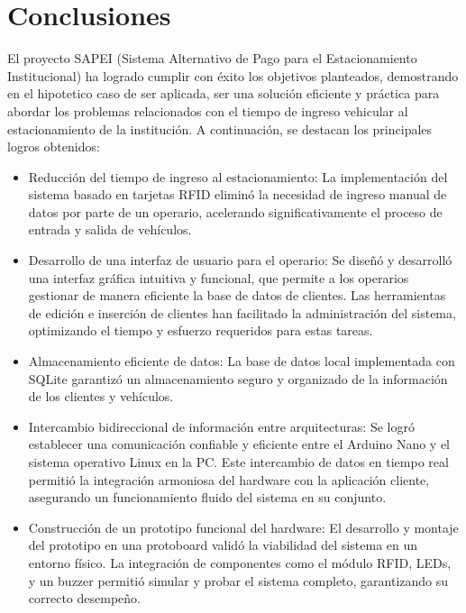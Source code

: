 \documentclass[a4paper, 12pt]{report}
\begin{document}
\newpage
\section{Conclusiones}
    El proyecto SAPEI (Sistema Alternativo de Pago para el Estacionamiento Institucional) ha logrado cumplir con éxito
    los objetivos planteados, demostrando en el hipotetico caso de ser aplicada, ser una solución eficiente y práctica
    para abordar los problemas relacionados con el tiempo de ingreso vehicular al estacionamiento de la institución.
    A continuación, se destacan los principales logros obtenidos:
    \begin{itemize}
        \item Reducción del tiempo de ingreso al estacionamiento: La implementación del sistema basado en tarjetas RFID
          eliminó la necesidad de ingreso manual de datos por parte de un operario, acelerando significativamente el
          proceso de entrada y salida de vehículos.

        \item Desarrollo de una interfaz de usuario para el operario: Se diseñó y desarrolló una interfaz gráfica
          intuitiva y funcional, que permite a los operarios gestionar de manera eficiente la base de datos de clientes.
          Las herramientas de edición e inserción de clientes han facilitado la administración del sistema, optimizando
          el tiempo y esfuerzo requeridos para estas tareas.

        \item Almacenamiento eficiente de datos: La base de datos local implementada con SQLite garantizó un
          almacenamiento seguro y organizado de la información de los clientes y vehículos.

        \item Intercambio bidireccional de información entre arquitecturas: Se logró establecer una comunicación
          confiable y eficiente entre el Arduino Nano y el sistema operativo Linux en la PC. Este intercambio de datos
          en tiempo real permitió la integración armoniosa del hardware con la aplicación cliente, asegurando un
          funcionamiento fluido del sistema en su conjunto.

        \item Construcción de un prototipo funcional del hardware: El desarrollo y montaje del prototipo en una
          protoboard validó la viabilidad del sistema en un entorno físico. La integración de componentes como el
          módulo RFID, LEDs, y un buzzer permitió simular y probar el sistema completo, garantizando su correcto
          desempeño.
    \end{itemize}
\end{document}
